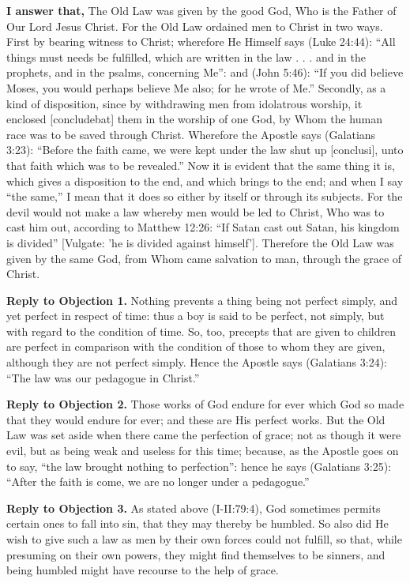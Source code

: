 \textbf{I answer that,} The Old Law was given by the good God, Who is the Father of Our Lord Jesus Christ. For the Old Law ordained men to Christ in two ways. First by bearing witness to Christ; wherefore He Himself says (Luke 24:44): ``All things must needs be fulfilled, which are written in the law . . . and in the prophets, and in the psalms, concerning Me'': and (John 5:46): ``If you did believe Moses, you would perhaps believe Me also; for he wrote of Me.'' Secondly, as a kind of disposition, since by withdrawing men from idolatrous worship, it enclosed [concludebat] them in the worship of one God, by Whom the human race was to be saved through Christ. Wherefore the Apostle says (Galatians 3:23): ``Before the faith came, we were kept under the law shut up [conclusi], unto that faith which was to be revealed.'' Now it is evident that the same thing it is, which gives a disposition to the end, and which brings to the end; and when I say ``the same,'' I mean that it does so either by itself or through its subjects. For the devil would not make a law whereby men would be led to Christ, Who was to cast him out, according to Matthew 12:26: ``If Satan cast out Satan, his kingdom is divided'' [Vulgate: 'he is divided against himself']. Therefore the Old Law was given by the same God, from Whom came salvation to man, through the grace of Christ.

\textbf{Reply to Objection 1.} Nothing prevents a thing being not perfect simply, and yet perfect in respect of time: thus a boy is said to be perfect, not simply, but with regard to the condition of time. So, too, precepts that are given to children are perfect in comparison with the condition of those to whom they are given, although they are not perfect simply. Hence the Apostle says (Galatians 3:24): ``The law was our pedagogue in Christ.''

\textbf{Reply to Objection 2.} Those works of God endure for ever which God so made that they would endure for ever; and these are His perfect works. But the Old Law was set aside when there came the perfection of grace; not as though it were evil, but as being weak and useless for this time; because, as the Apostle goes on to say, ``the law brought nothing to perfection'': hence he says (Galatians 3:25): ``After the faith is come, we are no longer under a pedagogue.''

\textbf{Reply to Objection 3.} As stated above (I-II:79:4), God sometimes permits certain ones to fall into sin, that they may thereby be humbled. So also did He wish to give such a law as men by their own forces could not fulfill, so that, while presuming on their own powers, they might find themselves to be sinners, and being humbled might have recourse to the help of grace.

